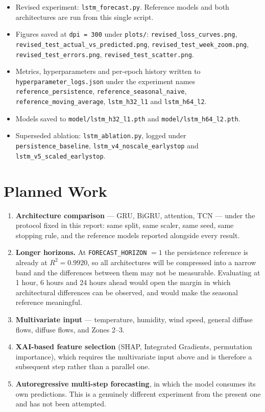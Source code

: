 \documentclass[11pt,a4paper]{article}
\begin{document}
\begin{itemize}
  \item Revised experiment: \texttt{lstm\_forecast.py}. Reference models and both architectures are
        run from this single script.
  \item Figures saved at \texttt{dpi = 300} under \texttt{plots/}:
        \texttt{revised\_loss\_curves.png},
        \texttt{revised\_test\_actual\_vs\_predicted.png},
        \texttt{revised\_test\_week\_zoom.png},
        \texttt{revised\_test\_errors.png},
        \texttt{revised\_test\_scatter.png}.
  \item Metrics, hyperparameters and per-epoch history written to
        \texttt{hyperparameter\_logs.json} under the experiment names
        \texttt{reference\_persistence}, \texttt{reference\_seasonal\_naive},
        \texttt{reference\_moving\_average}, \texttt{lstm\_h32\_l1} and \texttt{lstm\_h64\_l2}.
  \item Models saved to \texttt{model/lstm\_h32\_l1.pth} and \texttt{model/lstm\_h64\_l2.pth}.
  \item Superseded ablation: \texttt{lstm\_ablation.py}, logged under
        \texttt{persistence\_baseline}, \texttt{lstm\_v4\_noscale\_earlystop} and
        \texttt{lstm\_v5\_scaled\_earlystop}.
\end{itemize}


\section{Planned Work}

\begin{enumerate}
  \item \textbf{Architecture comparison} --- GRU, BiGRU, attention, TCN --- under the protocol
        fixed in this report: same split, same scaler, same seed, same stopping rule, and the
        reference models reported alongside every result.
  \item \textbf{Longer horizons.} At \texttt{FORECAST\_HORIZON} $=1$ the persistence reference is
        already at $R^2 = 0.9920$, so all architectures will be compressed into a narrow band and
        the differences between them may not be measurable. Evaluating at 1 hour, 6 hours and 24
        hours ahead would open the margin in which architectural differences can be observed, and
        would make the seasonal reference meaningful.
  \item \textbf{Multivariate input} --- temperature, humidity, wind speed, general diffuse flows,
        diffuse flows, and Zones 2--3.
  \item \textbf{XAI-based feature selection} (SHAP, Integrated Gradients, permutation importance),
        which requires the multivariate input above and is therefore a subsequent step rather than
        a parallel one.
  \item \textbf{Autoregressive multi-step forecasting}, in which the model consumes its own
        predictions. This is a genuinely different experiment from the present one and has not been
        attempted.
\end{enumerate}
\end{document}

